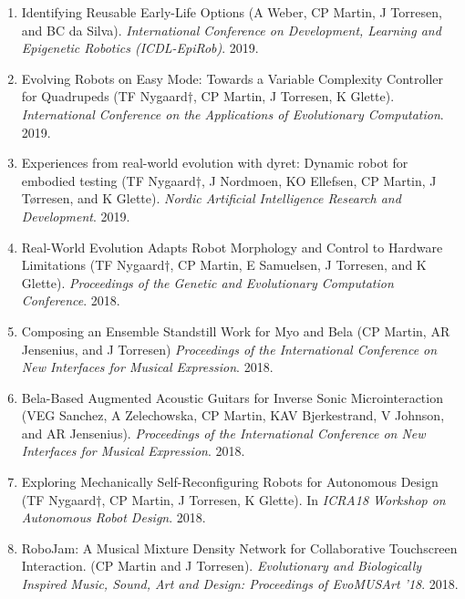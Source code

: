 \documentclass[11pt, a4paper, oneside]{article}
\begin{document}
\begin{enumerate}
\item Identifying Reusable Early-Life Options (A Weber, CP Martin,
  J Torresen, and BC da Silva).  \emph{International
    Conference on Development, Learning and Epigenetic Robotics
    (ICDL-EpiRob)}. 2019. 

\item Evolving Robots on Easy Mode: Towards a Variable Complexity
  Controller for Quadrupeds (TF Nygaard$\dagger$, CP Martin, J Torresen, K
  Glette). \emph{International Conference on the Applications of
    Evolutionary Computation}. 2019.

\item Experiences from real-world evolution with dyret: Dynamic robot
  for embodied testing (TF Nygaard$\dagger$, J Nordmoen, KO Ellefsen, CP Martin, J Tørresen, and K Glette). \emph{Nordic Artificial
    Intelligence Research and Development}. 2019.

\item Real-World Evolution Adapts Robot Morphology and Control to
  Hardware Limitations (TF Nygaard$\dagger$, CP Martin, E Samuelsen, J
  Torresen, and K Glette). \emph{Proceedings of the Genetic and
    Evolutionary Computation Conference}. 2018.
  
\item Composing an Ensemble Standstill Work for Myo and Bela (CP
  Martin, AR Jensenius, and J Torresen) \emph{Proceedings of the
    International Conference on New Interfaces for Musical
    Expression}. 2018. 

\item Bela-Based Augmented Acoustic Guitars for Inverse Sonic
  Microinteraction (VEG Sanchez, A Zelechowska,
  CP Martin, KAV Bjerkestrand, V Johnson, and AR
  Jensenius).  \emph{Proceedings of the
    International Conference on New Interfaces for Musical
    Expression}.  2018. 

\item Exploring Mechanically Self-Reconfiguring Robots for Autonomous
  Design (TF Nygaard$\dagger$, CP Martin, J Torresen, K
  Glette). In \emph{ICRA18 Workshop on Autonomous Robot Design}. 2018.

\item RoboJam: A Musical Mixture Density Network for Collaborative
  Touchscreen Interaction. (CP Martin and J Torresen).
  \emph{Evolutionary and Biologically Inspired Music, Sound, Art and
    Design: Proceedings of EvoMUSArt '18}. 2018.
   


\end{enumerate}
\end{document}
